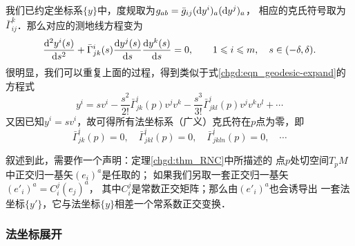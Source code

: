 


我们已约定坐标系$\{y\}$中，度规取为$g_{ab}=\bar{g}_{ij}({\rm d}y^i)_a({\rm d}y^j)_a$，
相应的克氏符号取为$\bar{\Gamma}^k_{ij}$．那么对应的测地线方程变为
\begin{equation}\label{chgd:eqn_geodesic-formula-RNC}
    \frac{{\rm d}^2 y^i(s)}{{\rm d}s^2} + \bar{\Gamma}_{jk}^i(s)
    \frac{{\rm d}y^j(s)}{{\rm d} s} \frac{{\rm d}y^k(s)}{{\rm d} s} =0,
    \qquad 1 \leqslant i \leqslant m , \quad s\in (-\delta,\delta).
\end{equation}
很明显，我们可以重复上面的过程，得到类似于式\eqref{chgd:eqn_geodesic-expand}的方程式
\begin{equation}\label{chgd:eqn_geodesic-expand-RNC}
    y^i =  s v^i  - \frac{s^2}{2!} \bar{\Gamma}_{jk}^i(p) v^j v^k
    - \frac{s^3}{3!}  \bar{\Gamma}^{i}_{jkl}(p) v^j v^k v^l + \cdots
\end{equation}
又因已知$y^i =  s v^i$，故可得所有法坐标系（广义）克氏符在$p$点为零，即
\begin{equation}\label{chgd:eqn_Christoffel=0-RNC}
    \bar{\Gamma}^i_{jk}(p)   =0, \quad
    \bar{\Gamma}^i_{jkl}(p)  =0, \quad
    \bar{\Gamma}^i_{jkln}(p) =0, \quad\cdots
\end{equation}

叙述到此，需要作一个声明：定理\ref{chgd:thm_RNC}中所描述的
点$p$处切空间$T_pM$中正交归一基矢$(e_i)^a$是任取的；
如果我们另取一套正交归一基矢$(e'_i)^a=C_i^j(e_j)^a$，
其中$C_i^j$是常数正交矩阵；那么由$(e'_i)^a$也会诱导出
一套法坐标$\{y'\}$，它与法坐标$\{y\}$相差一个常系数正交变换．

\subsubsection{法坐标展开}

